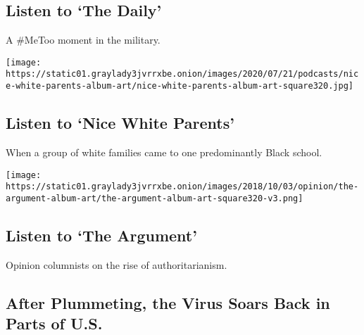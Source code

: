 \href{/2020/07/31/podcasts/the-daily/vanessa-guillen-military-metoo.html}{}

\hypertarget{listen-to-the-daily}{%
\subsection{Listen to `The Daily'}\label{listen-to-the-daily}}

A \#MeToo moment in the military.

\href{/2020/07/30/podcasts/nice-white-parents-serial.html}{}

\texttt{[image: https://static01.graylady3jvrrxbe.onion/images/2020/07/21/podcasts/nice-white-parents-album-art/nice-white-parents-album-art-square320.jpg]}

\href{/2020/07/30/podcasts/nice-white-parents-serial.html}{}

\hypertarget{listen-to-nice-white-parents}{%
\subsection{Listen to `Nice White
Parents'}\label{listen-to-nice-white-parents}}

When a group of white families came to one predominantly Black school.

\href{/2020/07/30/opinion/the-argument-authoritarianism-anne-applebaum.html}{}

\texttt{[image: https://static01.graylady3jvrrxbe.onion/images/2018/10/03/opinion/the-argument-album-art/the-argument-album-art-square320-v3.png]}

\href{/2020/07/30/opinion/the-argument-authoritarianism-anne-applebaum.html}{}

\hypertarget{listen-to-the-argument}{%
\subsection{Listen to `The Argument'}\label{listen-to-the-argument}}

Opinion columnists on the rise of authoritarianism.

\href{/2020/08/01/us/coronavirus-midwest-cases-deaths.html}{}

\hypertarget{after-plummeting-the-virus-soars-back-in-parts-of-us}{%
\subsection{After Plummeting, the Virus Soars Back in Parts of
U.S.}\label{after-plummeting-the-virus-soars-back-in-parts-of-us}}

